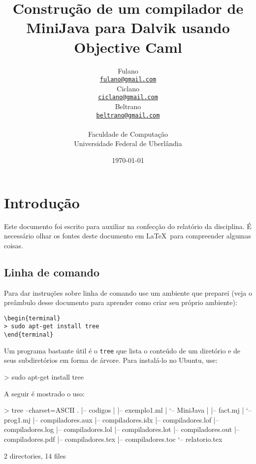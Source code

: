 \documentclass[12pt,a4paper,twoside]{report}
\title{Construção de um compilador de MiniJava para Dalvik usando Objective Caml}
\date{}
\author{Fulano \\
\texttt{\small \url{fulano@gmail.com}}\\
Ciclano \\
\texttt{\small \url{ciclano@gmail.com}}\\
Beltrano \\
\texttt{\small \url{beltrano@gmail.com}}\\
\vspace{1cm} \\
Faculdade de Computação \\
Universidade Federal de Uberlândia
}
\date{\today}
\begin{document}
  \maketitle
\listoffigures            
\listoftables            
\lstlistoflistings

\tableofcontents    


\fancyhead[RE,LO]{\thesection}

\setlength{\parskip}{0.15in} %

\chapter{Introdução}
Este documento foi escrito para auxiliar na confecção do relatório da
disciplina. É necessário olhar os fontes deste documento em \LaTeX\ para
compreender algumas coisas.

\section{Linha de comando}
Para dar instruções sobre linha de comando use um ambiente que preparei
(veja o preâmbulo desse documento para aprender como criar seu próprio
ambiente):

\begin{verbatim}
\begin{terminal}
> sudo apt-get install tree
\end{terminal}
\end{verbatim}

Um programa bastante útil é o \verb|tree| que lista o conteúdo de um
diretório e de seus subdiretórios em forma de árvore. Para instalá-lo no
Ubuntu, use:

\begin{terminal}
> sudo apt-get install tree
\end{terminal}

A seguir é mostrado o uso:
\begin{terminal}
> tree --charset=ASCII
.
|-- codigos
|   |-- exemplo1.ml
|   `-- MiniJava
|       |-- fact.mj
|       `-- prog1.mj
|-- compiladores.aux
|-- compiladores.idx
|-- compiladores.lof
|-- compiladores.log
|-- compiladores.lol
|-- compiladores.lot
|-- compiladores.out
|-- compiladores.pdf
|-- compiladores.tex
|-- compiladores.toc
`-- relatorio.tex

2 directories, 14 files
\end{terminal}
\end{document}

